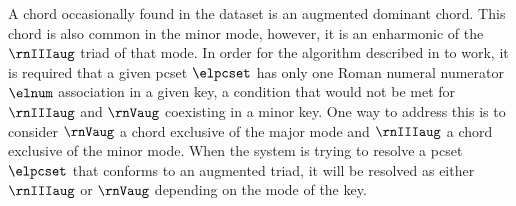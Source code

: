
A chord occasionally found in the dataset is an augmented
dominant chord. This chord is also common in the minor mode,
however, it is an enharmonic of the $\rnIIIaug$ triad of
that mode. In order for the algorithm described in
to work, it is required that a given \gls{pcset} $\elpcset$
has only one Roman numeral numerator $\elnum$ association in
a given key, a condition that would not be met for
$\rnIIIaug$ and $\rnVaug$ coexisting in a minor key. One way
to address this is to consider $\rnVaug$ a chord exclusive
of the major mode and $\rnIIIaug$ a chord exclusive of the
minor mode. When the system is trying to resolve a
\gls{pcset} $\elpcset$ that conforms to an augmented triad,
it will be resolved as either $\rnIIIaug$ or $\rnVaug$
depending on the mode of the key.
